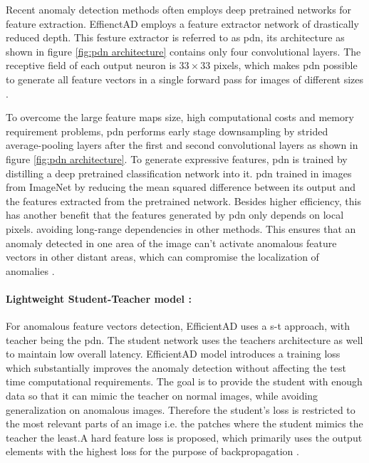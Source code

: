 Recent anomaly detection methods often employs deep pretrained networks for feature extraction. EffienctAD employs a feature extractor network of drastically reduced depth. This festure extractor is referred to as \gls{pdn}, its architecture as shown in figure \ref{fig:pdn architecture} contains only four convolutional layers. The receptive field of each output neuron is $33\times33$ pixels, which makes \gls{pdn} possible to generate all feature vectors in a single forward pass for images of different sizes \cite{batzner2024efficientadaccuratevisualanomaly}.

To overcome the large feature maps size, high computational costs and memory requirement problems, \gls{pdn} performs early stage downsampling by strided average-pooling layers after the first and second convolutional layers as shown in figure \ref{fig:pdn architecture}. To generate expressive features, \gls{pdn} is trained by distilling a deep pretrained classification network into it. \gls{pdn} trained in images from ImageNet by reducing the mean squared difference between its output and the features extracted from the pretrained network. Besides higher efficiency, this has another benefit that the features generated by \gls{pdn} only depends on local pixels. avoiding long-range dependencies in other methods. This ensures that an anomaly detected in one area of the image can't activate anomalous feature vectors in other distant areas, which can compromise the localization of anomalies \cite{batzner2024efficientadaccuratevisualanomaly}.

\paragraph*{Lightweight Student-Teacher model :}

For anomalous feature vectors detection, EfficientAD uses a \gls{s-t} approach, with teacher being the \gls{pdn}. The student network uses the teachers architecture as well to maintain low overall latency. EfficientAD model introduces a training loss  which substantially improves the anomaly detection without affecting the test time computational requirements. The goal is to provide the student with enough data so that it can mimic the teacher on normal images, while avoiding generalization on anomalous images. Therefore the student's loss is restricted to the most relevant parts of an image i.e. the patches where the student mimics the teacher the least.A hard feature loss is proposed, which primarily uses the output elements with the highest loss for the purpose of backpropagation \cite{batzner2024efficientadaccuratevisualanomaly}.

